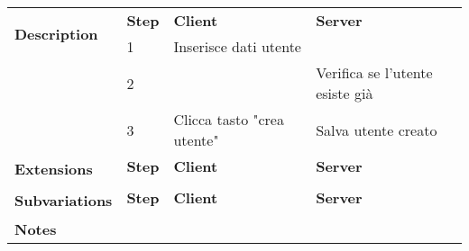 \begin{table}[H]
\begin{tabularx}{\linewidth}{|l|X|X|X|}
        \hline \multirow{2}{*}{\textbf{Description}} & \textbf{Step}                                                                     &
        \textbf{Client}                              & \textbf{Server}                                                                                                                                  \\
        \cline{2-4}                                  & 1                                                                                 & Inserisce dati utente      &                                 \\
        \cline{2-4}                                  & 2                                                                                 &                            & Verifica se l'utente esiste già \\
        \cline{2-4}                                  & 3                                                                                 & Clicca tasto "crea utente" & Salva utente creato             \\
        \hline \multirow{2}{*}{\textbf{Extensions}}  & \textbf{Step}                                                                     &
        \textbf{Client}                              & \textbf{Server}                                                                                                                                  \\
        \cline{2-4}                                  &                                                                                   &                            &                                 \\
        \hline
        \multirow{2}{*}{\textbf{Subvariations}}      & \textbf{Step}                                                                     & \textbf{Client}            & \textbf{Server}                 \\

        \cline{2-4}                                  &                                                                                   &                            &                                 \\
        \hline \textbf{Notes}                        & \multicolumn{3}{l|}{}                                                                                                                            \\
        \hline
    \end{tabularx}

\end{table}


